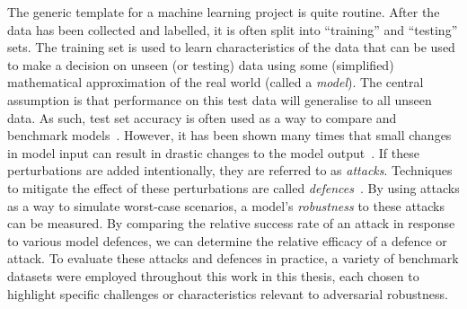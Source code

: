 The generic template for a machine learning project is quite routine. 
After the data has been collected and labelled, it is often split into ``training'' and ``testing'' sets. 
The training set is used to learn characteristics of the data that can be used to make a decision on unseen (or testing) data using some (simplified) mathematical approximation of the real world (called a \textit{model}). 
The central assumption is that performance on this test data will generalise to all unseen data. 
As such, test set accuracy is often used as a way to compare and benchmark models~\cite{croce2020robustbench,wang2019benchmarking}. 
However, it has been shown many times that small changes in model input can result in drastic changes to the model output~\cite{hopskipjump,fgm,biggio_evasion_2013,carlini_towards_2017,deepfool,hopskipjump}. 
If these perturbations are added intentionally, they are referred to as \textit{attacks}.  
Techniques to mitigate the effect of these perturbations are called \textit{defences}~\cite{feature_squeezing,fgm,gauss_aug,gauss_out}. 
By using attacks as a way to simulate worst-case scenarios, a model's \textit{robustness} to these attacks can be measured. 
By comparing the relative success rate of an attack in response to various model defences, we can determine the relative efficacy of a defence or attack. 
To evaluate these attacks and defences in practice, a variety of benchmark datasets were employed throughout this work in this thesis, each chosen to highlight specific challenges or characteristics relevant to adversarial robustness.


